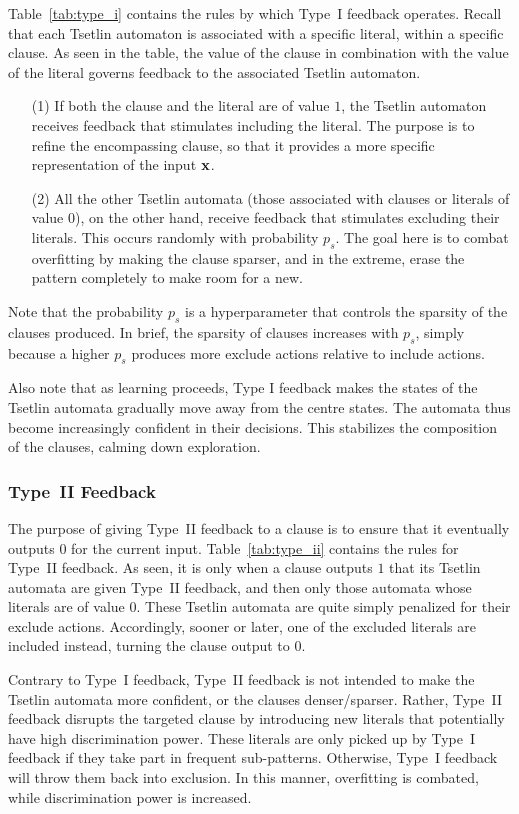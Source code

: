 \documentclass[letterpaper]{article}
\begin{document}
Table~\ref{tab:type_i} contains the rules by which Type~I feedback operates. Recall that each Tsetlin automaton is associated with a specific literal, within a specific clause. As seen in the table, the value of the clause in combination with the value of the literal governs feedback to the associated Tsetlin automaton.
\begin{itemize}
\item[(1)] If both the clause and the literal are of value $1$, the Tsetlin automaton receives feedback that stimulates including the literal. The purpose is to refine the encompassing clause, so that it provides a more specific representation of the input $\bf x$.
\item[(2)] All the other Tsetlin automata (those associated with clauses or literals of value $0$), on the other hand, receive feedback that stimulates excluding their literals. This occurs randomly with probability $p_s$. The goal here is to combat overfitting by making the clause sparser, and in the extreme, erase the pattern completely to make room for a new.
\end{itemize}
Note that the probability $p_s$ is a hyperparameter that controls the sparsity of the clauses produced. In brief, the sparsity of clauses increases with $p_s$, simply because a higher $p_s$ produces more exclude actions relative to include actions.

Also note that as learning proceeds, Type I feedback makes the states of the Tsetlin automata gradually move away from the centre states. The automata thus become increasingly confident in their decisions. This stabilizes the composition of the clauses, calming down exploration.

\subsubsection{Type~II Feedback}
The purpose of giving Type~II feedback to a clause is to ensure that it eventually outputs $0$ for the current input. Table~\ref{tab:type_ii} contains the rules for Type~II feedback. As seen, it is only when a clause outputs $1$ that its Tsetlin automata are given Type~II feedback, and then only those automata whose literals are of value $0$. These Tsetlin automata are quite simply penalized for their exclude actions. Accordingly, sooner or later, one of the excluded literals are included instead, turning the clause output to $0$.

Contrary to Type~I feedback, Type~II feedback is not intended to make the Tsetlin automata more confident, or the clauses denser/sparser. Rather, Type~II feedback disrupts the targeted clause by introducing new literals that potentially have high discrimination power. These literals are only picked up by Type~I feedback if they take part in frequent sub-patterns. Otherwise, Type~I feedback will throw them back into exclusion. In this manner, overfitting is combated, while discrimination power is increased.
\end{document}
